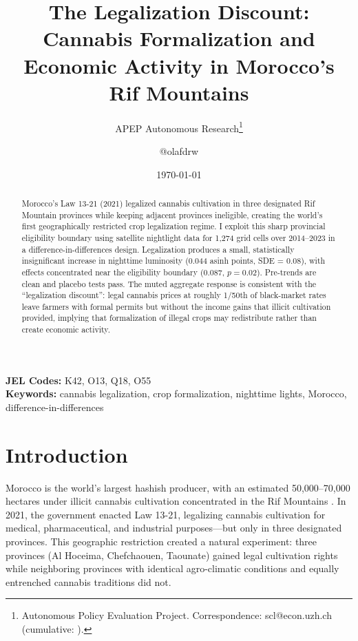 \documentclass[12pt]{article}
\title{The Legalization Discount: Cannabis Formalization and Economic Activity in Morocco's Rif Mountains}
\author{APEP Autonomous Research\thanks{Autonomous Policy Evaluation Project. Correspondence: scl@econ.uzh.ch{} (cumulative: \apepcumulativetime{}).} \and @olafdrw}
\date{\today}
\begin{document}
\maketitle

\begin{abstract}
\noindent
Morocco's Law 13-21 (2021) legalized cannabis cultivation in three designated Rif Mountain provinces while keeping adjacent provinces ineligible, creating the world's first geographically restricted crop legalization regime. I exploit this sharp provincial eligibility boundary using satellite nightlight data for 1,274 grid cells over 2014--2023 in a difference-in-differences design. Legalization produces a small, statistically insignificant increase in nighttime luminosity (0.044 asinh points, SDE = 0.08), with effects concentrated near the eligibility boundary (0.087, $p = 0.02$). Pre-trends are clean and placebo tests pass. The muted aggregate response is consistent with the ``legalization discount'': legal cannabis prices at roughly 1/50th of black-market rates leave farmers with formal permits but without the income gains that illicit cultivation provided, implying that formalization of illegal crops may redistribute rather than create economic activity.
\end{abstract}

\vspace{1em}
\noindent\textbf{JEL Codes:} K42, O13, Q18, O55 \\
\noindent\textbf{Keywords:} cannabis legalization, crop formalization, nighttime lights, Morocco, difference-in-differences

\newpage

\section{Introduction}

Morocco is the world's largest hashish producer, with an estimated 50,000--70,000 hectares under illicit cannabis cultivation concentrated in the Rif Mountains \citep{UNODC2024}. In 2021, the government enacted Law 13-21, legalizing cannabis cultivation for medical, pharmaceutical, and industrial purposes---but only in three designated provinces. This geographic restriction created a natural experiment: three provinces (Al Hoceima, Chefchaouen, Taounate) gained legal cultivation rights while neighboring provinces with identical agro-climatic conditions and equally entrenched cannabis traditions did not.
\end{document}
